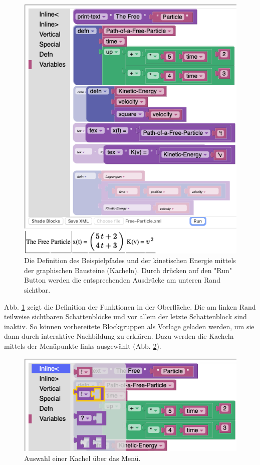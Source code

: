 \documentclass[twocolumn, 10pt]{article}
\begin{document}
\begin{figure}[h]
\includegraphics[scale=0.4]{bilder/session_11.png}
\caption{Die Definition des Beispielpfades und der kinetischen Energie mittels der graphischen Bausteine (Kacheln). Durch drücken auf den "Run" Button werden die entsprechenden Ausdrücke am unteren Rand sichtbar.}
\label{fig:session11}
\end{figure}

Abb. \ref{fig:session11} zeigt die Definition der Funktionen in der Oberfläche. Die am linken Rand teilweise sichtbaren Schattenblöcke und vor allem der letzte Schattenblock sind inaktiv. So können vorbereitete Blockgruppen als Vorlage geladen werden, um sie dann durch interaktive Nachbildung zu erklären. Dazu werden die Kacheln mittels der Menüpunkte links ausgewählt (Abb. \ref{fig:session21}). 
\begin{figure}[H]
\includegraphics[scale=0.4]{bilder/session_21.png}
\caption{Auswahl einer Kachel über das Menü.}
\label{fig:session21}
\end{figure}
\end{document}
